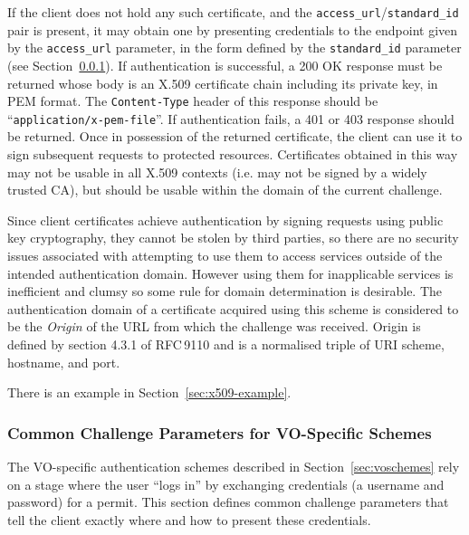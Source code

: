 \documentclass[11pt,a4paper]{ivoa}
\newcommand{\rfc}[1]{RFC\,#1}
\newcommand{\header}[1]{{\tt #1}}
\begin{document}
If the client does not hold any such certificate,
and the \verb|access_url|/\verb|standard_id| pair is present,
it may obtain one by presenting credentials
to the endpoint given by the \verb|access_url| parameter,
in the form defined by the \verb|standard_id| parameter
(see Section~\ref{sec:common-params}).
If authentication is successful, a 200 OK response must be returned
whose body is an X.509 certificate chain including its private key,
in PEM format.  The \header{Content-Type} header of this response
should be ``{\tt application/x-pem-file}''.
If authentication fails, a 401 or 403 response should be returned.
Once in possession of the returned certificate,
the client can use it to sign subsequent requests to protected resources.
Certificates obtained in this way may not be usable in all X.509 contexts
(i.e. may not be signed by a widely trusted CA),
but should be usable within the domain of the current challenge.

Since client certificates achieve authentication by signing requests
using public key cryptography, they cannot be stolen by third parties,
so there are no security issues associated with attempting to use them
to access services outside of the intended authentication domain.
However using them for inapplicable services is inefficient and clumsy
so some rule for domain determination is desirable.
The authentication domain of a certificate acquired using this scheme is
considered to be the {\em Origin\/} of the URL from which
the challenge was received.
Origin is defined by section 4.3.1 of \rfc{9110}
and is a normalised triple of URI scheme, hostname, and port.

There is an example in Section~\ref{sec:x509-example}.

\subsubsection{Common Challenge Parameters for VO-Specific Schemes}
\label{sec:common-params}

The VO-specific authentication schemes described in
Section~\ref{sec:voschemes}
rely on a stage where the user ``logs in'' by exchanging
credentials (a username and password) for a permit.
This section defines common challenge parameters that
tell the client exactly where and how to present these credentials.
\end{document}
